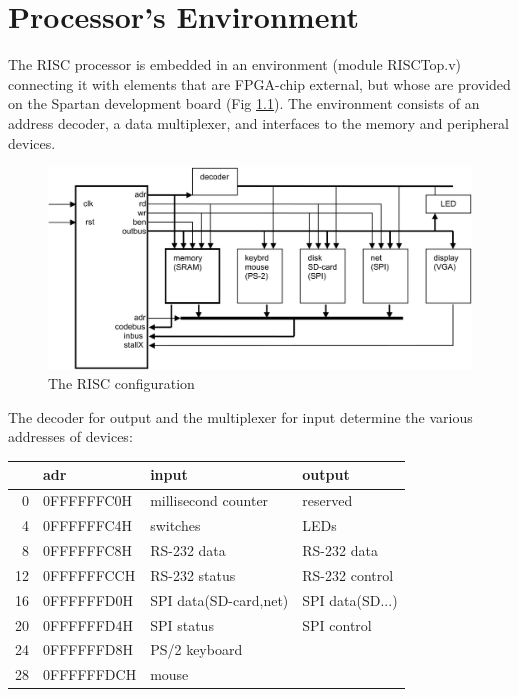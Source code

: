 \chapter{Processor's Environment}
\label{ch:env}
The RISC processor is embedded in an environment (module RISCTop.v) connecting it with elements that are
FPGA-chip external, but whose are provided on the Spartan development board (Fig \ref{fig:cfg}). The
environment consists of an address decoder, a data multiplexer, and interfaces to the memory and
peripheral devices.
\begin{figure}[h!]
  \flushleft
  \includegraphics[width=1.1\textwidth]{i/G/0.png}
  \caption{The RISC configuration}
  \label{fig:cfg}
\end{figure}

The decoder for output and the multiplexer for input determine the various addresses of devices:
\begin{table}[h!]
  \centering
  \begin{tabular}{r l l l}
       & adr        & input                 & output \\\hline
     0 & 0FFFFFFC0H & millisecond counter   & reserved \\
     4 & 0FFFFFFC4H & switches              & LEDs \\
     8 & 0FFFFFFC8H & RS-232 data           & RS-232 data \\
    12 & 0FFFFFFCCH & RS-232 status         & RS-232 control \\
    16 & 0FFFFFFD0H & SPI data(SD-card,net) & SPI data(SD...) \\
    20 & 0FFFFFFD4H & SPI status            & SPI control \\
    24 & 0FFFFFFD8H & PS/2 keyboard \\
    28 & 0FFFFFFDCH & mouse
  \end{tabular}
\end{table}

